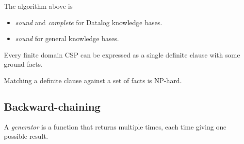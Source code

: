\documentclass{article}
\begin{document}
\begin{theorem}
	The algorithm above is
	\begin{itemize}
		\item \emph{sound} and \emph{complete} for Datalog knowledge bases.
		\item \emph{sound} for general knowledge bases.
	\end{itemize}
\end{theorem}

\begin{theorem}[R\&N p. 334]
	Every finite domain CSP can be expressed as a
	single definite clause with some ground facts.
\end{theorem}

\begin{theorem}
	Matching a definite clause against a set of facts is NP-hard.
\end{theorem}

\subsection{Backward-chaining}

\begin{definition}[R\&N p. 337]
	A \emph{generator} is a function that returns multiple times, each time giving one
	possible result.
\end{definition}
\end{document}
